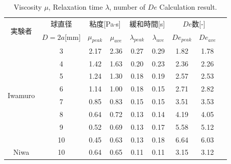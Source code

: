 \begin{table}[hbtp]
    \caption{Viscosity $\mu$, Relaxation time $\lambda$, number of $De$ Calculation result.}
    \label{table:iwamuro2}
    \centering
    \begin{tabular}{ccccccccc}
        \hline
        \multirow{2}{*}{実験者}  & 球直径     & \multicolumn{2}{c}{粘度[Pa$\cdot$s]} & \multicolumn{2}{c}{緩和時間[s]} & \multicolumn{2}{c}{$De$数[-]}                                              \\
                                 & $D=2a$[mm] & $\mu_{peak}$                         & $\mu_{ave}$                     & $\lambda_{peak}$              & $\lambda_{ave}$ & $De_{peak}$ & $De_{ave}$ \\
        \hline \hline
        \multirow{8}{*}{Iwamuro} & 3          & 2.17                                 & 2.36                            & 0.27                          & 0.29            & 1.82        & 1.78       \\
                                 & 4          & 1.42                                 & 1.63                            & 0.20                          & 0.23            & 2.36        & 2.26       \\
                                 & 5          & 1.24                                 & 1.30                            & 0.18                          & 0.19            & 2.57        & 2.53       \\
                                 & 6          & 1.14                                 & 1.00                            & 0.18                          & 0.15            & 2.71        & 2.82       \\
                                 & 7          & 0.85                                 & 0.83                            & 0.15                          & 0.15            & 3.51        & 3.53       \\
                                 & 8          & 0.64                                 & 0.72                            & 0.13                          & 0.14            & 4.19        & 4.05       \\
                                 & 9          & 0.52                                 & 0.69                            & 0.13                          & 0.17            & 5.58        & 5.12       \\
                                 & 10         & 0.45                                 & 0.63                            & 0.13                          & 0.18            & 6.64        & 6.03       \\
        \hline \hline
        Niwa                     & 10         & 0.64                                 & 0.65                            & 0.11                          & 0.11            & 3.15        & 3.12       \\
        \hline
    \end{tabular}
\end{table}

